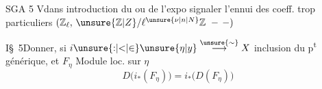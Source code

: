 \noindent SGA 5 \(\mathrm{V}\)\quad dans introduction du  ou de l'expo signaler l'ennui des coeff. trop particuliers \((\mathbb{Z}_{\ell},\,\unsure{\mathbb{Z}|Z}/\ell^{\unsure{\nu|n|N}}\mathbb{Z}\ -\,-)\)


\noindent \(\mathrm{I}\)\quad \S\ 5\qquad Donner, si \(i\unsure{{:}|{<}|{\in}}\unsure{\eta|y}\overset{\unsure{\sim}}{\longrightarrow} X\) inclusion du p\textsuperscript{t} générique, et \(F_{\eta}\) Module loc.  sur \(\eta\)
\[
 D\bigl(i_{*}(F_{\eta})\bigr)=i_{*}\bigl(D(F_{\eta})\bigr)
\]
\clearpage
